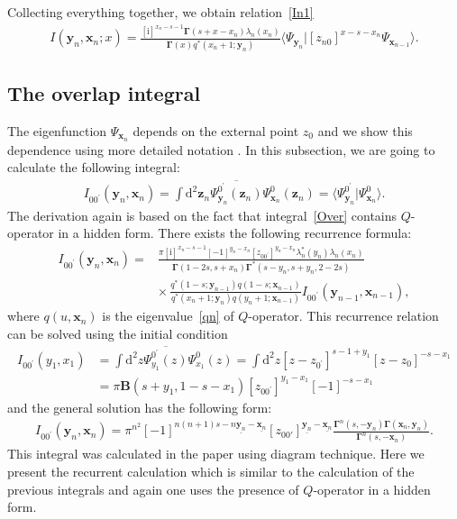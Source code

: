 \documentclass[pdftex]{sigma}
\renewcommand{\imath}{\mathrm{i}}
\numberwithin{equation}{section}
\begin{document}
Collecting everything together, we obtain relation~\eqref{In1}
\begin{align*}
I(\bm{y}_n,\bm{x}_{n};x) =
\frac{[\imath]^{x_n-s-1} \mathbf{\Gamma}(s+x-x_n) \lambda_n(x_n)}
{\mathbf{\Gamma}(x) q^*(x_n+1;\bm{y}_n)}
\langle \Psi_{\bm{y}_n}|
 [z_{n0}]^{x-s-x_n} \Psi_{\bm{x}_{n-1}}\rangle .
\end{align*}

\subsection{The overlap integral}

The eigenfunction $\Psi_{\bm{x}_{n}}$ depends on the external point
$z_0$ and we show this dependence using more detailed
notation .
In this subsection, we are going to calculate the following integral:
\begin{align}\label{Over}
I_{0 0^{\prime}}(\bm{y}_n,\bm{x}_{n}) =
\int \mathrm{d}^{2}\bm{z}_n
\overline{\Psi^{0^{\prime}}_{\bm{y}_n}(\bm{z}_n)}
\Psi^{0}_{\bm{x}_{n}}(\bm{z}_n) =
\bigl\langle\Psi^{0^{\prime}}_{\bm{y}_n} | \Psi^{0}_{\bm{x}_{n}}\bigr\rangle .
\end{align}
The derivation again is based on the fact that integral~\eqref{Over} contains $Q$-operator in a hidden form. There exists the following recurrence formula:
\begin{align}
\nonumber
I_{0 0^{\prime}}(\bm{y}_n,\bm{x}_{n}) ={}&
\frac{\pi [\imath]^{x_n-s-1} [-1]^{y_n-x_n} [z_{0 0^{\prime}}]^{y_n-x_n}\lambda_n^\ast(y_n) \lambda_n(x_n)}
{\mathbf{\Gamma}(1-2s,s+x_n) \mathbf{\Gamma}^{*}(s-y_n,s+y_n,2-2s)} \\
& \label{I0}
{\times}\, \frac{q^*(1-s;\bm{y}_{n-1}) q(1-s;\bm{x}_{n-1})}
{q^{*}(x_n+1;\bm{y}_n) q(y_n+1;\bm{x}_{n-1})}
I_{0 0^{\prime}}(\bm{y}_{n-1},\bm{x}_{n-1}) ,
\end{align}
where $q(u ,\bm x_{n})$ is the eigenvalue~\eqref{qn} of $Q$-operator.
This recurrence relation can be solved using the initial condition
\begin{align*}
I_{0 0^{\prime}}(y_1,x_{1}) & =
\int \mathrm{d}^{2} z
\overline{\Psi^{0^{\prime}}_{y_1}(z)}
\Psi^{0}_{x_{1}}(z) =
\int \mathrm{d}^{2} z
[z-z_{0^{\prime}}]^{s-1+y_1} [z-z_0]^{-s-x_1} \\
& =
\pi \mathbf{B}(s+y_1,1-s-x_1)
[z_{0 0^{\prime}}]^{y_1-x_1} [-1]^{-s-x_1}
\end{align*}
and the general solution has the following form:
\begin{align}
\label{In0}
I_{0 0^{\prime}}(\bm{y}_n,\bm{x}_{n}) = \pi^{n^2} [-1]^{n(n+1)s-n\underline{\bm{y}_n}-\underline{\bm{x}_n}}
[z_{00'}]^{\underline{\bm{y}_n}-\underline{\bm{x}_n}}
\frac{\mathbf{\Gamma}^{n}(s ,-\bm{y}_n) \mathbf{\Gamma}(\bm{x}_n,\bm{y}_n)}
{\mathbf{\Gamma}^{n}(s ,-\bm{x}_n)} .
\end{align}
This integral was calculated in the paper \cite{DMV2} using
diagram technique.
Here we present the recurrent calculation which is similar to the
calculation of the previous integrals and again one uses the presence
of $Q$-operator in a hidden form.
\end{document}
